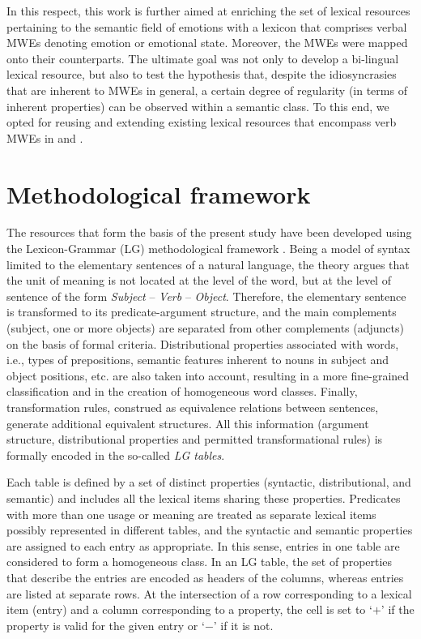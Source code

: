\documentclass[output=paper]{langsci/langscibook}
\begin{document}
\largerpage
In this respect, this work is further aimed at enriching the set
of lexical resources pertaining to the semantic field of emotions
with a lexicon that comprises verbal MWEs denoting emotion or emotional
state. Moreover, the  MWEs were mapped onto their  counterparts.
The ultimate goal was not only to develop a bi-lingual lexical
resource, but also to test the hypothesis that, despite the
idiosyncrasies that are inherent to MWEs in general, a certain degree
of regularity (in terms of inherent properties) can be observed within
a semantic class. To this end, we opted for reusing and extending
existing lexical resources that encompass verb MWEs in  and .

\section{Methodological framework}



The resources that form the basis of the present study have been
developed using the   
Lexicon-Grammar (LG) methodological framework
\citep{gross1975methodes}. Being a model of syntax limited to the elementary
sentences of a natural language, the theory argues that the unit of
meaning is not located at the level of the word, but at the level of
sentence of the form \textit{Subject} –
\textit{Verb} – \textit{Object}. Therefore, the
elementary sentence is  transformed to its predicate-argument
structure, and the main complements (subject, one or more objects) are
separated from other complements (adjuncts) on the basis of formal
criteria. Distributional properties associated with words, i.e., types
of prepositions, semantic features inherent to nouns in subject and
object positions, etc. are also taken into account, resulting in a more
fine-grained classification and in the creation of homogeneous word
classes. Finally, transformation rules, construed as equivalence
relations between sentences,  generate additional equivalent structures.
All this information (argument structure, distributional properties and
permitted transformational rules) is formally encoded in the so-called
\textit{LG tables}.



Each table is defined by a set of distinct properties (syntactic,
distributional, and semantic) and includes all the lexical items sharing
these properties. Predicates with more than one usage or meaning are
treated as separate lexical items possibly represented in different
tables, and the syntactic and semantic properties are assigned to each
entry as appropriate. In this sense, entries in one table are considered to form a homogeneous class. In an LG table, the set of properties
that describe the entries are encoded as headers of the
columns, whereas entries are listed at separate rows. At
the intersection of a row corresponding to a lexical item (entry) and a
column corresponding to a property, the cell is set to `$+$' if the
property is valid for the given entry or `$-$' if it is not. 
\end{document}
